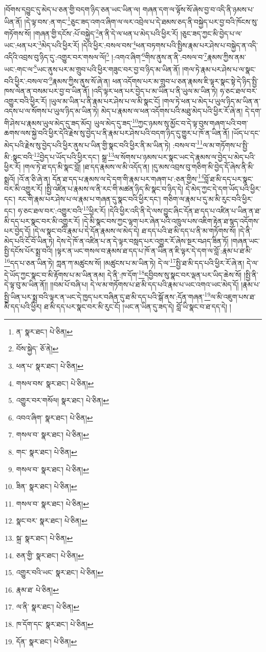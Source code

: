 །བོགས་དབྱུང་དུ་མེད་པ་ཅན་གྱི་བདག་ཉིད་ཅན་ཡང་ཡིན་ལ། གཞན་དག་ལ་ལྟོས་སོ་ཞེས་བྱ་བ་འདི་ནི་ཉམས་པ་ཡིན་ནོ། །དེ་ལྟ་བས་:ན་གང་\footnote{ན་  སྣར་ཐང་།  པེ་ཅིན། }ཅུང་ཟད་འགའ་ཞིག་ལ་ལར་འབྲེལ་པ་དེ་ཐམས་ཅད་ནི་བསྐྱེད་པར་བྱ་བའི་ཁོངས་སུ་གཏོགས་སོ། །གཞན་གྱི་དངོས་:པོ་བསྐྱེད་\footnote{བོས་སྐྱེད་  ཅོ་ནེ། }ན་ནི་དེ་ལ་ཕན་པ་མེད་པའི་ཕྱིར་རོ། །ཅུང་ཟད་ཀྱང་མི་བྱེད་པ་ལ་ཡང་:ཕན་པར་\footnote{ཕན་པ་  སྣར་ཐང་།  པེ་ཅིན། }མེད་པའི་ཕྱིར་རོ། །དེའི་ཕྱིར་:བསལ་བས་\footnote{གསལ་བས་  སྣར་ཐང་།  པེ་ཅིན། }ཕན་བཏགས་པའི་སྤྱིས་རྣམ་པར་ཤེས་པ་བསྐྱེད་ན་འདི་འདིའི་འབྲས་བུ་ཉིད་དུ་:འགྱུར་བར་གསལ་ལོ།\footnote{འགྱུར་བར་གསོལ།  སྣར་ཐང་།  པེ་ཅིན། } །:འགའ་ཞིག་\footnote{འབའ་ཞིག་  སྣར་ཐང་།  པེ་ཅིན། }གིས་ནུས་ན་ནི་:བསལ་བ་\footnote{གསལ་བ་  སྣར་ཐང་།  པེ་ཅིན། }རྣམས་ཀྱིས་ནམ་ཡང་:གང་ལ་\footnote{གང་  སྣར་ཐང་།  པེ་ཅིན། }ཡང་ནུས་པར་མ་གྲུབ་པའི་ཕྱིར་གཟུང་བར་བྱ་བ་ཉིད་མ་ཡིན་ནོ། །གལ་ཏེ་རྣམ་པར་ཤེས་པ་ལ་སྣང་བའི་ཕྱིར་:བསལ་བ་\footnote{གསལ་བ་  སྣར་ཐང་།  པེ་ཅིན། }རྣམས་ཀྱིས་ནུས་སོ་ཞེ་ན། ཕན་འདོགས་པར་མ་གྲུབ་པ་ཅན་རྣམས་ཇི་ལྟར་སྣང་སྟེ་དེ་ཉིད་སྤྱི་ཁས་ལེན་ན་བསམ་པར་བྱ་བ་ཡིན་ནོ། །འདི་ལྟར་ཕན་པར་བྱེད་པ་མ་ཡིན་པ་ནི་ཡུལ་མ་ཡིན་ཏེ། ཧ་ཅང་ཐལ་བར་འགྱུར་བའི་ཕྱིར་རོ། །ཡུལ་མ་ཡིན་པ་ནི་རྣམ་པར་ཤེས་པ་ལ་མི་སྣང་ངོ། །གལ་ཏེ་ཕན་པ་མེད་པ་ཡུལ་ཉིད་མ་ཡིན་ན་འདས་པ་ལ་སོགས་པ་ཡུལ་ཉིད་མ་ཡིན་ཏེ། མེད་པ་རྣམས་ལ་ཕན་འདོགས་པའི་མཐུ་མེད་པའི་ཕྱིར་རོ་ཞེ་ན། དེ་དག་གི་ཤེས་པ་རྣམས་ཡུལ་མེད་དུ་ཟད་མོད། ཡུལ་མེད་དུ་ཟད་\footnote{ཟིན་  སྣར་ཐང་།  པེ་ཅིན། }ཀྱང་ཉམས་སུ་མྱོང་བ་དེ་ལྟ་བུས་གཞག་པའི་བག་ཆགས་ལས་སྐྱེ་བའི་ཕྱིར་དེའི་རྗེས་སུ་བྱེད་པ་ནི་རྣམ་པར་ཤེས་པའི་བདག་ཉིད་དུ་གྱུར་པ་ཁོ་ན་ཡིན་ནོ། །ཡོད་པ་དང་མེད་པའི་རྗེས་སུ་བྱེད་པའི་ཕྱིར་ནུས་པ་ཡིན་གྱི་སྣང་བའི་ཕྱིར་ནི་མ་ཡིན་ཏེ། :བསལ་བ་\footnote{གསལ་བ་  སྣར་ཐང་།  པེ་ཅིན། }ལ་མ་གཏོགས་པ་སྤྱི་མི་:སྣང་བའི་\footnote{སྣང་བར་  སྣར་ཐང་།  པེ་ཅིན། }བྱེད་པ་ཡོད་པའི་ཕྱིར་དང་། སྒྲ་\footnote{སྐྲ་  སྣར་ཐང་།  པེ་ཅིན། }ལ་སོགས་པ་ཉམས་པར་སྣང་ཡང་དེ་རྣམས་ལ་བྱེད་པ་མེད་པའི་ཕྱིར་རོ། །གལ་ཏེ་ཐ་དད་མི་སྣང་བློ། །ཐ་དད་རྣམས་ལ་མི་འདོད་ན། །དུ་མས་འབྲས་བུ་གཅིག་མི་བྱེད་དོ་ཞེས་ནི་མི་སྨྲའོ། །འོ་ན་ཅི་ཞེ་ན། དོན་ཐ་དད་པ་རྣམས་ལ་དེ་དག་གི་རྣམ་པར་གཞག་པ་:ཅན་གྱིས་\footnote{ཅན་གྱི་  སྣར་ཐང་།  པེ་ཅིན། }བློ་ཐ་མི་དད་པར་སྣང་བར་མི་འགྱུར་རོ། །སྤྱི་འཛིན་པ་རྣམས་ལ་ནི་རང་གི་མཚན་ཉིད་མི་སྣང་བ་ཉིད་དེ། དེ་མེད་ཀྱང་དེ་དག་ཡོད་པའི་ཕྱིར་དང་། རང་གི་རྣམ་པར་ཤེས་པ་ལ་རྣམ་པ་གཞན་དུ་སྣང་བའི་ཕྱིར་དང་། གཅིག་ལ་རྣམ་པ་དུ་མ་མི་རུང་བའི་ཕྱིར་དང་། ཧ་ཅང་ཐལ་བར་:འགྱུར་བའི་\footnote{འགྱུར་བའི་ཡང་  སྣར་ཐང་།  པེ་ཅིན། }ཕྱིར་རོ། །དེའི་ཕྱིར་འདི་ནི་དེ་ལས་བྱུང་ཞིང་དོན་ཐ་དད་པ་འཛིན་པ་ཡིན་ན་ཐ་མི་དད་པར་སྣང་བར་མི་འགྱུར་རོ། །དེ་མི་སྣང་བས་ཀྱང་ལྷག་པར་ཞེན་པའི་འཁྲུལ་པས་འཇིག་རྟེན་ཐ་སྙད་འདོགས་པར་བྱེད་དོ། །དེ་ལ་སྣང་བའི་རྣམ་པ་དེ་དོན་རྣམས་ལ་མེད་དེ། ཐ་དད་པའི་ཐ་མི་དད་པ་ནི་མ་གཏོགས་སོ། །དེ་ནི་མེད་པའི་ངོ་བོ་ཡིན་ཏེ། དེས་དེ་ཁོ་ན་འཛིན་པ་ན་དེ་ལྟར་བསླད་པར་འགྱུར་རོ་ཞེས་སྔར་བཤད་ཟིན་ཏོ། །གཞན་ཡང་སྤྱི་དངོས་པོར་སྨྲ་བའི། །ལྟར་ན་ཡང་གསལ་བ་རྣམས་ཐ་དད་པ་ཁོ་ན་ཡིན་ན་ཇི་ལྟར་དེ་དག་ལ་བློ་:རྣམ་པ་ཐ་མི་\footnote{རྣམ་ཐ་  པེ་ཅིན། }དད་པ་ཅན་ཡིན་ཏེ། ཀླན་ཀ་མཚུངས་སོ། །མཚུངས་པ་མ་ཡིན་ཏེ། དེ་ལ་\footnote{ལ་ནི་  སྣར་ཐང་།  པེ་ཅིན། }སྤྱི་ཐ་མི་དད་པའི་ཕྱིར་རོ་ཞེ་ན། དེ་ལ་དེ་ཡོད་ཀྱང་སྣང་བ་མི་རྟོགས་པ་མ་ཡིན་ནམ། དེ་ནི་:ཁ་དོག་\footnote{ཁ་དོག་དང་  སྣར་ཐང་།  པེ་ཅིན། }དབྱིབས་སུ་སྣང་བར་ལྡན་པར་ཡིད་ཆེས་སོ། །སྤྱི་ནི་དེ་ལྟ་བུ་མ་ཡིན་ནོ།། །།བམ་པོ་བཞི་པ། དེ་ལ་མ་གཏོགས་པ་ཐ་མི་དད་པའི་རྣམ་པ་ཡང་འགའ་ཡང་མེད་དོ། །རྣམ་པ་སྤྱི་ཡིན་པར་སྨྲ་བའི་ལྟར་ན་ཡང་དེ་ཁྱད་པར་བཞིན་དུ་ཐ་མི་དད་པའི་སྒོ་ནས་:དོན་གཞན་\footnote{དོན་  སྣར་ཐང་།  པེ་ཅིན། }ལ་མི་འཇུག་པས་ཐ་མི་དད་པའི་ཕྱིར། ཐ་མི་དད་པར་སྣང་བར་མི་རུང་ངོ། །ཡང་ན་ཡིན་དུ་ཟད་དེ། བློ་ཡི་སྣང་བ་ཐ་དད་དེ། །
